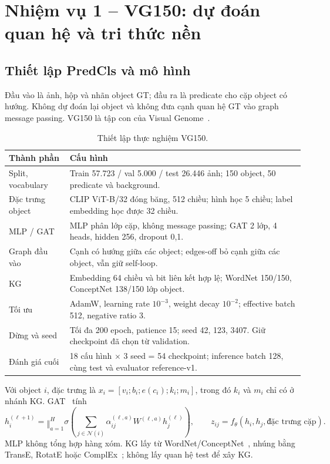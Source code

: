 \clearpage
\section{Nhiệm vụ 1 -- VG150: dự đoán quan hệ và tri thức nền}
\subsection{Thiết lập PredCls và mô hình}
Đầu vào là ảnh, hộp và nhãn object GT; đầu ra là predicate cho cặp object có
hướng. Không dự đoán lại object và không đưa cạnh quan hệ GT vào graph message
passing. VG150 là tập con của Visual Genome~\cite{krishna2017visualgenome}.

\begin{table}[H]\centering\small
\caption{Thiết lập thực nghiệm VG150.}\label{tab:vgsetup}
\begin{tabularx}{\linewidth}{@{}p{40mm}X@{}}\toprule
Thành phần & Cấu hình\\\midrule
Split, vocabulary & Train 57.723 / val 5.000 / test 26.446 ảnh; 150 object, 50 predicate và background.\\
Đặc trưng object & CLIP ViT-B/32 đóng băng, 512 chiều; hình học 5 chiều; label embedding học được 32 chiều.\\
MLP / GAT & MLP phân lớp cặp, không message passing; GAT 2 lớp, 4 heads, hidden 256, dropout 0,1.\\
Graph đầu vào & Cạnh có hướng giữa các object; edges-off bỏ cạnh giữa các object, vẫn giữ self-loop.\\
KG & Embedding 64 chiều và bit liên kết hợp lệ; WordNet 150/150, ConceptNet 138/150 lớp object.\\
Tối ưu & AdamW, learning rate $10^{-3}$, weight decay $10^{-2}$; effective batch 512, negative ratio 3.\\
Dừng và seed & Tối đa 200 epoch, patience 15; seed 42, 123, 3407. Giữ checkpoint đã chọn từ validation.\\
Đánh giá cuối & 18 cấu hình $\times$ 3 seed = 54 checkpoint; inference batch 128, cùng test và evaluator reference-v1.\\
\bottomrule\end{tabularx}\end{table}

Với object $i$, đặc trưng là $x_i=[v_i;b_i;e(c_i);k_i;m_i]$,
trong đó $k_i$ và $m_i$ chỉ có ở nhánh KG. GAT~\cite{velickovic2018gat} tính
\[
h_i^{(\ell+1)}=\mathop{\Vert}_{a=1}^{H}
\sigma\!\left(\sum_{j\in\mathcal N(i)}\alpha_{ij}^{(\ell,a)}
W^{(\ell,a)}h_j^{(\ell)}\right),\qquad
z_{ij}=f_\theta(h_i,h_j,\text{đặc trưng cặp}).
\]
MLP không tổng hợp hàng xóm. KG lấy từ
WordNet/ConceptNet~\cite{miller1995wordnet,speer2017conceptnet}, nhúng bằng
TransE, RotatE hoặc ComplEx~\cite{bordes2013transe,sun2019rotate,trouillon2016complex};
không lấy quan hệ test để xây KG.

